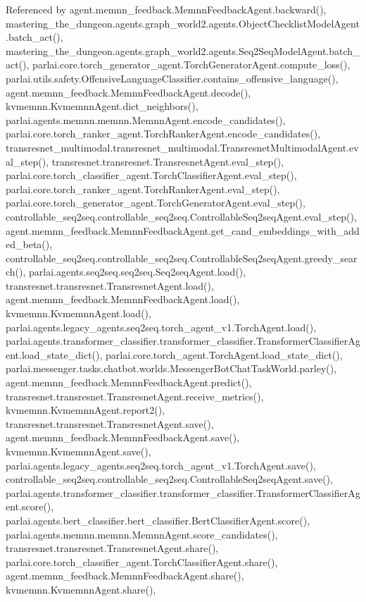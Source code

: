 Referenced by agent.\+memnn\+\_\+feedback.\+Memnn\+Feedback\+Agent.\+backward(), mastering\+\_\+the\+\_\+dungeon.\+agents.\+graph\+\_\+world2.\+agents.\+Object\+Checklist\+Model\+Agent.\+batch\+\_\+act(), mastering\+\_\+the\+\_\+dungeon.\+agents.\+graph\+\_\+world2.\+agents.\+Seq2\+Seq\+Model\+Agent.\+batch\+\_\+act(), parlai.\+core.\+torch\+\_\+generator\+\_\+agent.\+Torch\+Generator\+Agent.\+compute\+\_\+loss(), parlai.\+utils.\+safety.\+Offensive\+Language\+Classifier.\+contains\+\_\+offensive\+\_\+language(), agent.\+memnn\+\_\+feedback.\+Memnn\+Feedback\+Agent.\+decode(), kvmemnn.\+Kvmemnn\+Agent.\+dict\+\_\+neighbors(), parlai.\+agents.\+memnn.\+memnn.\+Memnn\+Agent.\+encode\+\_\+candidates(), parlai.\+core.\+torch\+\_\+ranker\+\_\+agent.\+Torch\+Ranker\+Agent.\+encode\+\_\+candidates(), transresnet\+\_\+multimodal.\+transresnet\+\_\+multimodal.\+Transresnet\+Multimodal\+Agent.\+eval\+\_\+step(), transresnet.\+transresnet.\+Transresnet\+Agent.\+eval\+\_\+step(), parlai.\+core.\+torch\+\_\+classifier\+\_\+agent.\+Torch\+Classifier\+Agent.\+eval\+\_\+step(), parlai.\+core.\+torch\+\_\+ranker\+\_\+agent.\+Torch\+Ranker\+Agent.\+eval\+\_\+step(), parlai.\+core.\+torch\+\_\+generator\+\_\+agent.\+Torch\+Generator\+Agent.\+eval\+\_\+step(), controllable\+\_\+seq2seq.\+controllable\+\_\+seq2seq.\+Controllable\+Seq2seq\+Agent.\+eval\+\_\+step(), agent.\+memnn\+\_\+feedback.\+Memnn\+Feedback\+Agent.\+get\+\_\+cand\+\_\+embeddings\+\_\+with\+\_\+added\+\_\+beta(), controllable\+\_\+seq2seq.\+controllable\+\_\+seq2seq.\+Controllable\+Seq2seq\+Agent.\+greedy\+\_\+search(), parlai.\+agents.\+seq2seq.\+seq2seq.\+Seq2seq\+Agent.\+load(), transresnet.\+transresnet.\+Transresnet\+Agent.\+load(), agent.\+memnn\+\_\+feedback.\+Memnn\+Feedback\+Agent.\+load(), kvmemnn.\+Kvmemnn\+Agent.\+load(), parlai.\+agents.\+legacy\+\_\+agents.\+seq2seq.\+torch\+\_\+agent\+\_\+v1.\+Torch\+Agent.\+load(), parlai.\+agents.\+transformer\+\_\+classifier.\+transformer\+\_\+classifier.\+Transformer\+Classifier\+Agent.\+load\+\_\+state\+\_\+dict(), parlai.\+core.\+torch\+\_\+agent.\+Torch\+Agent.\+load\+\_\+state\+\_\+dict(), parlai.\+messenger.\+tasks.\+chatbot.\+worlds.\+Messenger\+Bot\+Chat\+Task\+World.\+parley(), agent.\+memnn\+\_\+feedback.\+Memnn\+Feedback\+Agent.\+predict(), transresnet.\+transresnet.\+Transresnet\+Agent.\+receive\+\_\+metrics(), kvmemnn.\+Kvmemnn\+Agent.\+report2(), transresnet.\+transresnet.\+Transresnet\+Agent.\+save(), agent.\+memnn\+\_\+feedback.\+Memnn\+Feedback\+Agent.\+save(), kvmemnn.\+Kvmemnn\+Agent.\+save(), parlai.\+agents.\+legacy\+\_\+agents.\+seq2seq.\+torch\+\_\+agent\+\_\+v1.\+Torch\+Agent.\+save(), controllable\+\_\+seq2seq.\+controllable\+\_\+seq2seq.\+Controllable\+Seq2seq\+Agent.\+save(), parlai.\+agents.\+transformer\+\_\+classifier.\+transformer\+\_\+classifier.\+Transformer\+Classifier\+Agent.\+score(), parlai.\+agents.\+bert\+\_\+classifier.\+bert\+\_\+classifier.\+Bert\+Classifier\+Agent.\+score(), parlai.\+agents.\+memnn.\+memnn.\+Memnn\+Agent.\+score\+\_\+candidates(), transresnet.\+transresnet.\+Transresnet\+Agent.\+share(), parlai.\+core.\+torch\+\_\+classifier\+\_\+agent.\+Torch\+Classifier\+Agent.\+share(), agent.\+memnn\+\_\+feedback.\+Memnn\+Feedback\+Agent.\+share(), kvmemnn.\+Kvmemnn\+Agent.\+share(), 